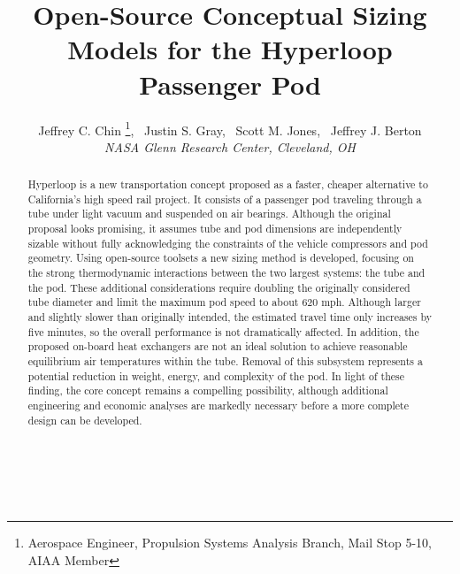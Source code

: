 \documentclass[]             %
{aiaa-tc}                       %
\title{Open-Source Conceptual Sizing Models for the Hyperloop Passenger Pod}
\author{
  Jeffrey C. Chin%
     \footnote{Aerospace Engineer, Propulsion Systems Analysis Branch, Mail Stop 5-10, AIAA Member},
  \ Justin S. Gray\footnotemark[\value{footnote}] ,%
  \ Scott M. Jones\footnotemark[\value{footnote}] ,%
  \ Jeffrey J. Berton\footnotemark[\value{footnote}]%
   \\
  {\normalsize\itshape
  NASA Glenn Research Center, Cleveland, OH}
}
\begin{document}
\maketitle

\begin{abstract}
Hyperloop is a new transportation concept proposed as a faster, cheaper alternative to California's high speed rail project.
It consists of a passenger pod traveling through a tube under light vacuum and suspended on air bearings.
Although the original proposal looks promising,
it assumes tube and pod dimensions are independently sizable without fully acknowledging
the constraints of the vehicle compressors and pod geometry.
Using open-source toolsets a new sizing method is developed, focusing on 
the strong thermodynamic interactions between the two largest systems: the tube and the pod.
These additional considerations require doubling the originally considered tube diameter
and limit the maximum pod speed to about 620 mph.
Although larger and slightly slower than originally intended, the estimated travel time only increases by five minutes,
so the overall performance is not dramatically affected.
In addition, the proposed on-board heat exchangers are not an ideal solution
to achieve reasonable equilibrium air temperatures within the tube.
Removal of this subsystem represents a potential reduction in weight, energy, and complexity of the pod.
In light of these finding, the core concept remains a compelling possibility,
although additional engineering and economic analyses are markedly necessary before a more complete design can be developed.
\\
\\
\\
\\

\end{abstract}  

\setcounter{secnumdepth}{1}
\setcounter{tocdepth}{1}
\printnomenclature
 





\end{document}
